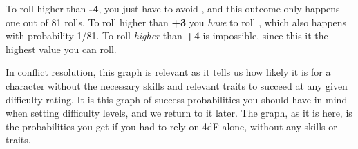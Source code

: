 To roll higher than \textbf{-4}, you just have to avoid \FudgeRes{----}, and this outcome only happens one out of 81 rolls. To roll higher than \textbf{+3} you \emph{have} to roll \FudgeRes{++++}, which also happens with probability 1/81. To roll \emph{higher} than \textbf{+4} is impossible, since this it the highest value you can roll.

In conflict resolution, this graph is relevant as it tells us how likely it is for a character without the necessary skills and relevant traits to succeed at any given difficulty rating. It is this graph of success probabilities you should have in mind when setting difficulty levels, and we return to it later. The graph, as it is here, is the probabilities you get if you had to rely on 4dF alone, without any skills or traits.


